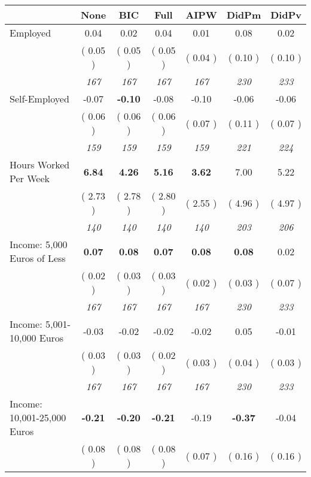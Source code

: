 \begin{tabular}{l c c c c c c}
\toprule
 & None & BIC & Full & AIPW & DidPm & DidPv \\
\midrule
Employed &      0.04 &      0.02 &      0.04 &      0.01 &      0.08 &      0.02 \\
& (     0.05 ) & (     0.05 ) & (     0.05 ) & (     0.04 ) & (     0.10 ) & (     0.10 ) \\
& \textit{ 167 } & \textit{ 167 } & \textit{ 167 } & \textit{ 167 } & \textit{ 230 } & \textit{ 233 } \\
Self-Employed &     -0.07 & \textbf{     -0.10 } &     -0.08 &     -0.10 &     -0.06 &     -0.06 \\
& (     0.06 ) & (     0.06 ) & (     0.06 ) & (     0.07 ) & (     0.11 ) & (     0.07 ) \\
& \textit{ 159 } & \textit{ 159 } & \textit{ 159 } & \textit{ 159 } & \textit{ 221 } & \textit{ 224 } \\
Hours Worked Per Week & \textbf{      6.84 } & \textbf{      4.26 } & \textbf{      5.16 } & \textbf{     3.62} &      7.00 &      5.22 \\
& (     2.73 ) & (     2.78 ) & (     2.80 ) & (     2.55 ) & (     4.96 ) & (     4.97 ) \\
& \textit{ 140 } & \textit{ 140 } & \textit{ 140 } & \textit{ 140 } & \textit{ 203 } & \textit{ 206 } \\
Income: 5,000 Euros of Less & \textbf{      0.07 } & \textbf{      0.08 } & \textbf{      0.07 } & \textbf{     0.08} & \textbf{      0.08 } &      0.02 \\
& (     0.02 ) & (     0.03 ) & (     0.03 ) & (     0.02 ) & (     0.03 ) & (     0.07 ) \\
& \textit{ 167 } & \textit{ 167 } & \textit{ 167 } & \textit{ 167 } & \textit{ 230 } & \textit{ 233 } \\
Income: 5,001-10,000 Euros &     -0.03 &     -0.02 &     -0.02 &     -0.02 &      0.05 &     -0.01 \\
& (     0.03 ) & (     0.03 ) & (     0.02 ) & (     0.03 ) & (     0.04 ) & (     0.03 ) \\
& \textit{ 167 } & \textit{ 167 } & \textit{ 167 } & \textit{ 167 } & \textit{ 230 } & \textit{ 233 } \\
Income: 10,001-25,000 Euros & \textbf{     -0.21 } & \textbf{     -0.20 } & \textbf{     -0.21 } &     -0.19 & \textbf{     -0.37 } &     -0.04 \\
& (     0.08 ) & (     0.08 ) & (     0.08 ) & (     0.07 ) & (     0.16 ) & (     0.16 ) \\

\end{tabular}
